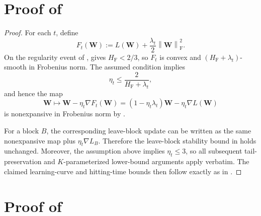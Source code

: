 \documentclass[11pt]{article}
\theoremstyle{definition}
\newcommand{\Wb}{\mathbf{W}}
\newcommand{\normF}[1]{\left\lVert #1\right\rVert_{\mathrm F}}
\newcommand{\HF}{H_{\mathrm F}}
\begin{document}
\section{Proof of }
\begin{proof}
For each $t$, define
\[
F_t(\Wb)
:=
L(\Wb)+\frac{\lambda_t}{2}\normF{\Wb}^2.
\]
On the regularity event of ,
 gives $\HF<2/3$, so $F_t$ is convex and
$(\HF+\lambda_t)$-smooth in Frobenius norm.  The assumed condition implies
\[
\eta_t
\leq
\frac{2}{\HF+\lambda_t},
\]
and hence the map
\[
\Wb\mapsto
\Wb-\eta_t\nabla F_t(\Wb)
=
(1-\eta_t\lambda_t)\Wb-\eta_t\nabla L(\Wb)
\]
is nonexpansive in Frobenius norm by .

For a block $B$, the corresponding leave-block update can be written as
the same nonexpansive map plus
$\eta_t\nabla L_B$.  Therefore the leave-block stability bound in
 holds unchanged.  Moreover, the assumption above
implies $\eta_t\leq3$, so all subsequent tail-preservation and
$K$-parameterized lower-bound arguments apply verbatim.  The claimed
learning-curve and hitting-time bounds then follow exactly as in
.
\end{proof}

\section{Proof of }
\end{document}
